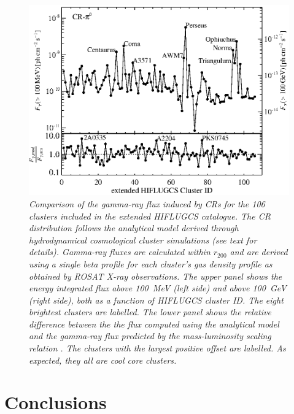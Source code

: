 \documentclass[10pt,aps,pra,reprint,amsmath,amsfonts,amssymb,showpacs,nofootinbib,floatfix]{revtex4-1}
\newcommand{\rvir}{r_{200}}
\begin{document}
\begin{figure}%
\begin{minipage}{2.0\columnwidth}
 \includegraphics[width=0.99\columnwidth]{figures/Flux.comp.CR.eps}
 \caption{\it Comparison of the gamma-ray flux induced by CRs for the
   106 clusters included in the extended HIFLUGCS catalogue.  The CR
   distribution follows the analytical model derived through
   hydrodynamical cosmological cluster simulations \protect
   \cite{2010MNRAS.409..449P} (see text for details).  Gamma-ray
   fluxes are calculated within $\rvir$ and are derived using a single
   beta profile for each cluster's gas density profile as obtained by
   ROSAT X-ray observations. The upper panel shows the energy
   integrated flux above 100~MeV (left side) and above 100~GeV (right
   side), both as a function of HIFLUGCS cluster ID. The eight
   brightest clusters are labelled. The lower panel shows the relative
   difference between the the flux computed using the analytical model
   and the gamma-ray flux predicted by the mass-luminosity scaling
   relation \cite{2010MNRAS.409..449P}. The clusters with the largest
   positive offset are labelled. As expected, they all are cool core
   clusters.}
 \label{fig19}
\end{minipage}
\end{figure}


\section{Conclusions}
\end{document}

